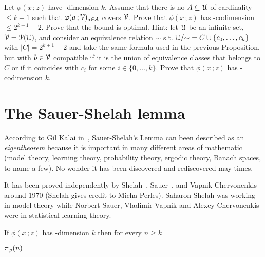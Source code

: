 \documentclass[scombinatorics.tex]{subfiles}
\begin{document}
\begin{exercise}
  Let $\phi(x\,;z)$ have \vc-dimension $k$.
  Assume that there is no $A\subseteq\EuScript U$ of cardinality $\le k+1$ such that $\varphi(a\,;\EuScript V)_{a\in A}$ covers $\EuScript V$.
  Prove that $\phi(x\,;z)$ has \vc-codimension $\le2^{k+1}-2$.
  Prove that the bound is optimal.
  Hint: let $\EuScript U$ be an infinite set, $\EuScript V = \EuScript P(\EuScript U)$, and consider an equivalence relation $\sim$ s.t. $\EuScript U / {\sim} = C \cup \{c_0, \dots, c_k\}$ with $|C| = 2^{k+1}-2$ and take the same formula used in the previous Proposition, but with $b \in \EuScript V$ compatible if it is the union of equivalence classes that belongs to $C$ or if it coincides with $c_i$ for some $i \in \{0,\dots, k\}$.
  Prove that $\phi(x\,;z)$ has \vc-codimension $k$.\QED
\end{exercise}


  


\section{The Sauer-Shelah lemma}\label{sauer}

\def\ceq#1#2#3{\parbox[t]{15ex}{$\displaystyle #1$}\medrel{#2}{$\displaystyle #3$}}

According to Gil Kalai in~\cite{kalai}, Sauer-Shelah's Lemma can been described as an \textit{eigentheorem\/} because it is important in many different areas of mathematic (model theory, learning theory, probability theory, ergodic theory, Banach spaces, to name a few).
No wonder it has been discovered and rediscovered may times.

It has been proved independently by Shelah~\cite{shelah72}, Sauer~\cite{sauer}, and Vapnik-Cher\-vo\-nen\-kis~\cite{VC} around 1970 (Shelah gives credit to Micha Perles).
Saharon Shelah was working in model theory while Norbert Sauer, Vladimir Vapnik and Alexey Chervonenkis were in statistical learning theory.

\begin{void_thm}\label{lem_sauer}
If $\phi(x\,;z)$ has \vc-dimension $k$ then for every $n\ge k$

\ceq{\hfill\pi_\phi(n)}{\le}{\bigsum^{k}_{i=0} \binom{n}{i}.}\QED 
\end{void_thm}
\end{document}
